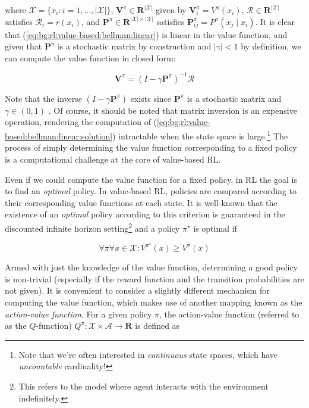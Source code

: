 where $\mathcal{X} = \{x_i : i = 1,\dots,|\mathcal{X}|\}$,
$\pmb{V}^\pi\in\mathbf{R}^{|\mathcal{X}|}$ given by $\pmb{V}^\pi_i =
V^\pi(x_i)$, $\pmb{\mathcal{R}}\in\mathbf{R}^{|\mathcal{X}|}$
satisfies $\pmb{\mathcal{R}}_i = r(x_i)$, and
$\pmb{P}^\pi\in\mathbf{R}^{|\mathcal{X}|\times|\mathcal{X}|}$
satisfies $\pmb{P}^\pi_{ij} = P^\pi(x_j\mid x_i)$. It is clear that
(\ref{eq:bg:rl:value-based:bellman:linear}) is linear in the value
function, and given that $\pmb{P}^\pi$ is a stochastic matrix by
construction and $|\gamma|<1$ by definition, we can compute the value
function in closed form:

\begin{equation}
  \label{eq:bg:rl:value-based:bellman:linear:solution}
  \pmb{V}^\pi = \left(I - \gamma\pmb{P}^\pi\right)^{-1}\pmb{\mathcal{R}}
\end{equation}

Note that the inverse $(I - \gamma\pmb{P}^\pi)$ exists since $\pmb{P}^\pi$ is a
stochastic matrix and $\gamma\in(0,1)$ \citep{puterman2014markov}. Of course, it
should be noted that matrix inversion is an expensive
operation, rendering the computation of
(\ref{eq:bg:rl:value-based:bellman:linear:solution}) intractable when
the state space is large.\footnote{Note that we're often interested in
  \emph{continuous} state spaces, which have \emph{uncountable}
  cardinality!} The process of simply determining the
value function corresponding to a fixed policy is a computational
challenge at the core of value-based RL.

Even if we could compute the value function for a fixed policy, in RL
the goal is to find an \emph{optimal} policy. In value-based RL,
policies are compared according to their corresponding value functions
at each state. It is well-known that the existence of an
\emph{optimal} policy according to this criterion is guaranteed
\citep{puterman2014markov} in the discounted infinite horizon
setting\footnote{This refers to the model where agent interacts with
  the environment indefinitely.}
and a policy $\pi^\star$ is optimal if

\begin{equation*}
  \forall\pi\forall x\in\mathcal{X}:V^{\pi^\star}(x)\geq V^\pi(x)
\end{equation*}

Armed with just the knowledge of the value function, determining a
good policy is non-trivial (especially if the reward function and the
transition probabilities are not given). It is convenient to consider
a slightly different mechanism for computing the value function, which
makes use of another mapping known as the \emph{action-value
  function}. For a given policy $\pi$, the action-value function
(referred to as the $Q$-function)
$Q^\pi: \mathcal{X}\times\mathcal{A}\to\mathbf{R}$ is defined as

